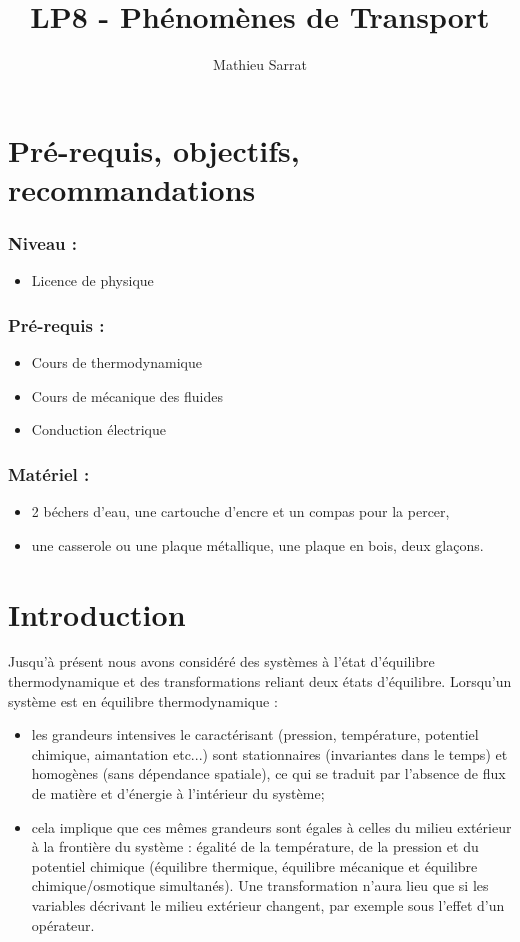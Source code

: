 \documentclass[11pt,a4paper]{report}
\author{Mathieu Sarrat}
\title{LP8 - Phénomènes de Transport}
\begin{document}
\maketitle
\newpage
\section*{Pré-requis, objectifs, recommandations}

\subsubsection*{Niveau :}
\begin{itemize}
	\item Licence de physique
\end{itemize}

\subsubsection*{Pré-requis :}
\begin{itemize}
	\item Cours de thermodynamique
	\item Cours de mécanique des fluides
	\item Conduction électrique 
\end{itemize}

\subsubsection*{Matériel :}
\begin{itemize}
	\item 2 béchers d'eau, une cartouche d'encre et un compas pour la percer,
	\item une casserole ou une plaque métallique, une plaque en bois, deux glaçons.
\end{itemize}

\section*{Introduction}
Jusqu'à présent nous avons considéré des systèmes à l'état d'équilibre thermodynamique et des transformations reliant deux états d'équilibre. Lorsqu'un système est en équilibre thermodynamique :
\begin{itemize}
\item les grandeurs intensives le caractérisant (pression, température, potentiel chimique, aimantation etc...) sont stationnaires (invariantes dans le temps) et homogènes (sans dépendance spatiale), ce qui se traduit par l'absence de flux de matière et d'énergie à l'intérieur du système;
\item cela implique que ces mêmes grandeurs sont égales à celles du milieu extérieur à la frontière du système : égalité de la température, de la pression et du potentiel chimique (équilibre thermique, équilibre mécanique et équilibre chimique/osmotique simultanés). Une transformation n'aura lieu que si les variables décrivant le milieu extérieur changent, par exemple sous l'effet d'un opérateur.\\
\end{itemize}
\end{document}
